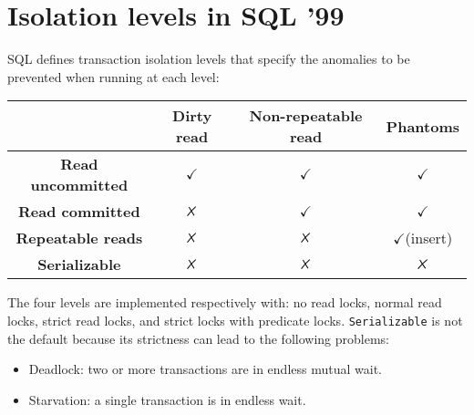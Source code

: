 \section{Isolation levels in SQL '99}

SQL defines transaction isolation levels that specify the anomalies to be prevented when running at each level:

\begin{table}[H]
    \centering      
    \begin{tabular}{c|ccc|}
    \cline{2-4}
                                                    & \textbf{Dirty read} & \textbf{Non-repeatable read} & \textbf{Phantoms}    \\ \hline
    \multicolumn{1}{|c|}{\textbf{Read uncommitted}} & $\checkmark$        & $\checkmark$                 & $\checkmark$         \\
    \multicolumn{1}{|c|}{\textbf{Read committed}}   & $\tikzxmark$        & $\checkmark$                 & $\checkmark$         \\
    \multicolumn{1}{|c|}{\textbf{Repeatable reads}}  & $\tikzxmark$        & $\tikzxmark$                 & $\checkmark$(insert) \\
    \multicolumn{1}{|c|}{\textbf{Serializable}}     & $\tikzxmark$        & $\tikzxmark$                 & $\tikzxmark$         \\ \hline
    \end{tabular}
\end{table}
The four levels are implemented respectively with: no read locks, normal read locks, strict read locks, and strict locks with predicate locks. 
\texttt{Serializable} is not the default because its strictness can lead to the following problems:
\begin{itemize}
    \item Deadlock: two or more transactions are in endless mutual wait. 
    \item Starvation: a single transaction is in endless wait. 
\end{itemize}